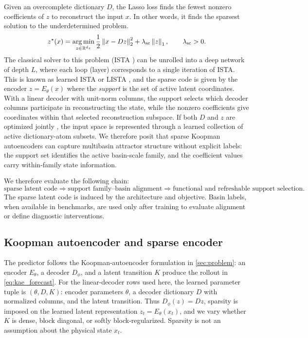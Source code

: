 \documentclass[11pt]{article}
\newcommand{\R}{\mathbb{R}}
\newcommand{\Enc}{E_\theta}
\newcommand{\Dec}{D_\phi}
\newcommand{\argmin}{\operatorname*{arg\,min}}
\newcommand{\norm}[1]{\left\lVert #1 \right\rVert}
\theoremstyle{plain}
\theoremstyle{definition}
\begin{document}
Given an overcomplete dictionary $D$, the Lasso loss \citep{beck2009fast} finds the fewest nonzero coefficients of $z$ to reconstruct the input $x$. In other words, it finds the sparsest solution to the underdetermined problem.
\begin{equation}
  z^\star(x)
  =
  \argmin_{z\in\R^{d_z}}
  \frac{1}{2}\norm{x-Dz}_2^2+\lambda_{\rm sc}\norm{z}_1,
  \qquad \lambda_{\rm sc}>0.
  \label{eq:sparse_coding_objective}
\end{equation}
The classical solver to this problem (ISTA \citep{beck2009fast}) can be unrolled into a deep network of depth $L$, where each loop (layer) corresponds to a single iteration of ISTA. This is known as learned ISTA or LISTA \citep{gregor_learning_2010}, and the sparse code is given by the encoder \(z=\Enc(x)\) where the \emph{support} is the set of active latent coordinates. With a linear decoder with unit-norm columns, the support selects which decoder columns participate in reconstructing the state, while the nonzero coefficients give coordinates within that selected reconstruction subspace. If both $D$ and $z$ are optimized jointly \citep{olshausen_emergence_1996}, the input space is represented through a learned collection of active dictionary-atom subsets. We therefore posit that sparse Koopman autoencoders can capture multibasin attractor structure without explicit labels: the support set identifies the active basin-scale family, and the coefficient values carry within-family state information.


We therefore evaluate the following chain:
\begin{equation}
  \text{sparse latent code}
  \Longrightarrow
  \text{support family--basin alignment}
  \Longrightarrow
  \text{functional and refreshable support selection}.
  \label{eq:claim_chain}
\end{equation}
The sparse latent code is induced by the architecture and objective. Basin labels, when available in benchmarks, are used only after training to evaluate alignment or define diagnostic interventions.

\subsection{Koopman autoencoder and sparse encoder}
\label{sec:method_model}

The predictor follows the Koopman-autoencoder formulation in \cref{sec:problem}: an encoder \(\Enc\), a decoder \(\Dec\), and a latent transition \(K\) produce the rollout in \cref{eq:kae_forecast}. For the linear-decoder rows used here, the learned parameter tuple is \((\theta,D,K)\): encoder parameters \(\theta\), a decoder dictionary \(D\) with normalized columns, and the latent transition. Thus \(\Dec(z)=Dz\), sparsity is imposed on the learned latent representation \(z_t=\Enc(x_t)\), and we vary whether \(K\) is dense, block diagonal, or softly block-regularized. Sparsity is not an assumption about the physical state \(x_t\).
\end{document}

